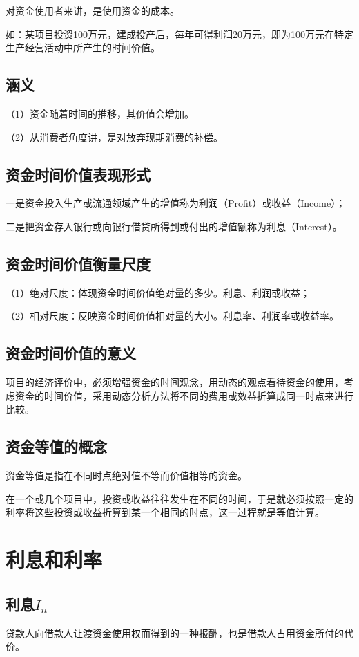 对资金使用者来讲，是使用资金的成本。

如：某项目投资100万元，建成投产后，每年可得利润20万元，即为100万元在特定生产经营活动中所产生的时间价值。

\subsection{涵义}
（1）资金随着时间的推移，其价值会增加。

（2）从消费者角度讲，是对放弃现期消费的补偿。

\subsection{资金时间价值表现形式}
一是资金投入生产或流通领域产生的增值称为利润（Profit）或收益（Income）；

二是把资金存入银行或向银行借贷所得到或付出的增值额称为利息（Interest）。

\subsection{资金时间价值衡量尺度}
（1）绝对尺度：体现资金时间价值绝对量的多少。利息、利润或收益；

（2）相对尺度：反映资金时间价值相对量的大小。利息率、利润率或收益率。

\subsection{资金时间价值的意义}
项目的经济评价中，必须增强资金的时间观念，用动态的观点看待资金的使用，考虑资金的时间价值，采用动态分析方法将不同的费用或效益折算成同一时点来进行比较。

\subsection{资金等值的概念}

资金等值是指在不同时点绝对值不等而价值相等的资金。

在一个或几个项目中，投资或收益往往发生在不同的时间，于是就必须按照一定的利率将这些投资或收益折算到某一个相同的时点，这一过程就是等值计算。

\section{利息和利率}
\subsection{利息$I_n$}
贷款人向借款人让渡资金使用权而得到的一种报酬，也是借款人占用资金所付的代价。

